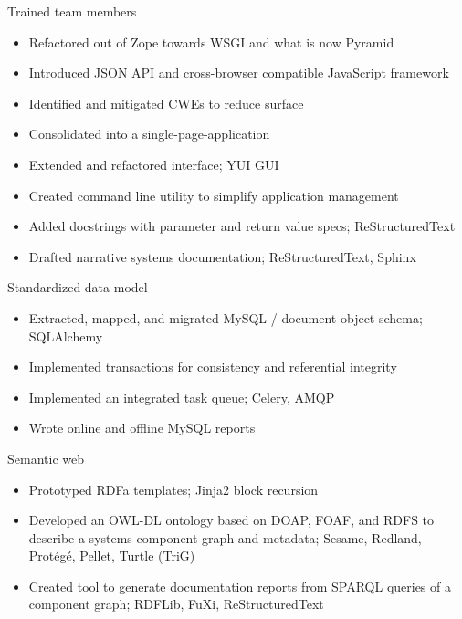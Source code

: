 \documentclass[letter,,openany,oneside]{sphinxhowto}
\begin{document}
Trained team members
\begin{itemize}
\item {} 
Refactored out of Zope towards WSGI and what is now Pyramid

\item {} 
Introduced JSON API and cross-browser compatible JavaScript framework

\item {} 
Identified and mitigated CWEs to reduce surface

\item {} 
Consolidated into a single-page-application

\item {} 
Extended and refactored interface; YUI GUI

\item {} 
Created command line utility to simplify application management

\item {} 
Added docstrings with parameter and return value specs; ReStructuredText

\item {} 
Drafted narrative systems documentation; ReStructuredText, Sphinx

\end{itemize}

Standardized data model
\begin{itemize}
\item {} 
Extracted, mapped, and migrated MySQL / document object schema; SQLAlchemy

\item {} 
Implemented transactions for consistency and referential integrity

\item {} 
Implemented an integrated task queue; Celery, AMQP

\item {} 
Wrote online and offline MySQL reports

\end{itemize}

Semantic web
\begin{itemize}
\item {} 
Prototyped RDFa templates; Jinja2 block recursion

\item {} 
Developed an OWL-DL ontology based on DOAP, FOAF, and RDFS to describe
a systems component graph and metadata; Sesame, Redland, Protégé, Pellet,
Turtle (TriG)

\item {} 
Created tool to generate documentation reports from SPARQL queries
of a component graph; RDFLib, FuXi, ReStructuredText

\end{itemize}
\end{document}
